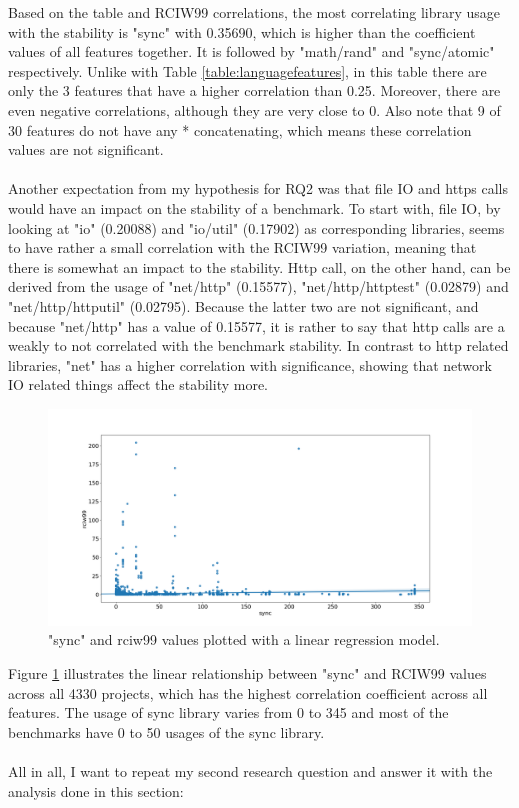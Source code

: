 \documentclass{seal_thesis}
\begin{document}
\noindent Based on the table and RCIW99 correlations, the most correlating library usage with the stability is "sync" with 0.35690, which is higher than the coefficient values of all features together. It is followed by "math/rand" and "sync/atomic" respectively. Unlike with Table \ref{table:languagefeatures}, in this table there are only the 3 features that have a higher correlation than 0.25. Moreover, there are even negative correlations, although they are very close to 0. Also note that 9 of 30 features do not have any * concatenating, which means these correlation values are not significant.\\
\\
Another expectation from my hypothesis for RQ2 was that file IO and https calls would have an impact on the stability of a benchmark. To start with, file IO, by looking at "io" (0.20088) and "io/util" (0.17902) as corresponding libraries, seems to have rather a small correlation with the RCIW99 variation, meaning that there is somewhat an impact to the stability. Http call, on the other hand, can be derived from the usage of "net/http" (0.15577), "net/http/httptest" (0.02879) and "net/http/httputil" (0.02795). Because the latter two are not significant, and because "net/http" has a value of 0.15577, it is rather to say that http calls are a weakly to not correlated with the benchmark stability. In contrast to http related libraries, "net" has a higher correlation with significance, showing that network IO related things affect the stability more.

\begin{figure}[H]
	\centering
	\includegraphics[width=\textwidth]{syncregression}
	\caption{"sync" and rciw99 values plotted with a linear regression model.}
	\label{fig:syncregression}
\end{figure}

\noindent Figure \ref{fig:syncregression} illustrates the linear relationship between "sync" and RCIW99 values across all 4330 projects, which has the highest correlation coefficient across all features. The usage of sync library varies from 0 to 345 and most of the benchmarks have 0 to 50 usages of the sync library.\\
\\
All in all, I want to repeat my second research question and answer it with the analysis done in this section:
\end{document}
